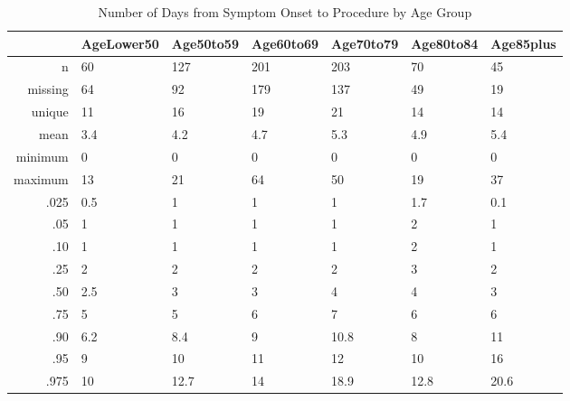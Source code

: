 \documentclass[a4paper]{report}
\begin{document}
\begin{itemize}
{%
\begin{table}[ht]
\centering
\begin{tabular}{rllllll}
  \toprule
 & AgeLower50 & Age50to59 & Age60to69 & Age70to79 & Age80to84 & Age85plus \\ 
  \midrule
n & 60 & 127 & 201 & 203 & 70 & 45 \\ 
  missing & 64 & 92 & 179 & 137 & 49 & 19 \\ 
  unique & 11 & 16 & 19 & 21 & 14 & 14 \\ 
  mean & 3.4 & 4.2 & 4.7 & 5.3 & 4.9 & 5.4 \\ 
  minimum & 0 & 0 & 0 & 0 & 0 & 0 \\ 
  maximum & 13 & 21 & 64 & 50 & 19 & 37 \\ 
  .025 & 0.5 & 1 & 1 & 1 & 1.7 & 0.1 \\ 
  .05 & 1 & 1 & 1 & 1 & 2 & 1 \\ 
  .10 & 1 & 1 & 1 & 1 & 2 & 1 \\ 
  .25 & 2 & 2 & 2 & 2 & 3 & 2 \\ 
  .50 & 2.5 & 3 & 3 & 4 & 4 & 3 \\ 
  .75 & 5 & 5 & 6 & 7 & 6 & 6 \\ 
  .90 & 6.2 & 8.4 & 9 & 10.8 & 8 & 11 \\ 
  .95 & 9 & 10 & 11 & 12 & 10 & 16 \\ 
  .975 & 10 & 12.7 & 14 & 18.9 & 12.8 & 20.6 \\ 
   \bottomrule
\end{tabular}
\caption{Number of Days from Symptom Onset to Procedure by Age Group} 
\end{table}


}
\end{itemize}
\end{document}
